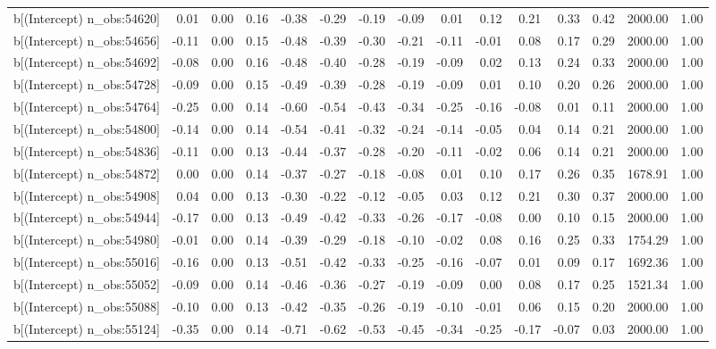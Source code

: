 \begin{table}[ht]
\begin{tabular}{rrrrrrrrrrrrrrr}
  b[(Intercept) n\_obs:54620] & 0.01 & 0.00 & 0.16 & -0.38 & -0.29 & -0.19 & -0.09 & 0.01 & 0.12 & 0.21 & 0.33 & 0.42 & 2000.00 & 1.00 \\ 
  b[(Intercept) n\_obs:54656] & -0.11 & 0.00 & 0.15 & -0.48 & -0.39 & -0.30 & -0.21 & -0.11 & -0.01 & 0.08 & 0.17 & 0.29 & 2000.00 & 1.00 \\ 
  b[(Intercept) n\_obs:54692] & -0.08 & 0.00 & 0.16 & -0.48 & -0.40 & -0.28 & -0.19 & -0.09 & 0.02 & 0.13 & 0.24 & 0.33 & 2000.00 & 1.00 \\ 
  b[(Intercept) n\_obs:54728] & -0.09 & 0.00 & 0.15 & -0.49 & -0.39 & -0.28 & -0.19 & -0.09 & 0.01 & 0.10 & 0.20 & 0.26 & 2000.00 & 1.00 \\ 
  b[(Intercept) n\_obs:54764] & -0.25 & 0.00 & 0.14 & -0.60 & -0.54 & -0.43 & -0.34 & -0.25 & -0.16 & -0.08 & 0.01 & 0.11 & 2000.00 & 1.00 \\ 
  b[(Intercept) n\_obs:54800] & -0.14 & 0.00 & 0.14 & -0.54 & -0.41 & -0.32 & -0.24 & -0.14 & -0.05 & 0.04 & 0.14 & 0.21 & 2000.00 & 1.00 \\ 
  b[(Intercept) n\_obs:54836] & -0.11 & 0.00 & 0.13 & -0.44 & -0.37 & -0.28 & -0.20 & -0.11 & -0.02 & 0.06 & 0.14 & 0.21 & 2000.00 & 1.00 \\ 
  b[(Intercept) n\_obs:54872] & 0.00 & 0.00 & 0.14 & -0.37 & -0.27 & -0.18 & -0.08 & 0.01 & 0.10 & 0.17 & 0.26 & 0.35 & 1678.91 & 1.00 \\ 
  b[(Intercept) n\_obs:54908] & 0.04 & 0.00 & 0.13 & -0.30 & -0.22 & -0.12 & -0.05 & 0.03 & 0.12 & 0.21 & 0.30 & 0.37 & 2000.00 & 1.00 \\ 
  b[(Intercept) n\_obs:54944] & -0.17 & 0.00 & 0.13 & -0.49 & -0.42 & -0.33 & -0.26 & -0.17 & -0.08 & 0.00 & 0.10 & 0.15 & 2000.00 & 1.00 \\ 
  b[(Intercept) n\_obs:54980] & -0.01 & 0.00 & 0.14 & -0.39 & -0.29 & -0.18 & -0.10 & -0.02 & 0.08 & 0.16 & 0.25 & 0.33 & 1754.29 & 1.00 \\ 
  b[(Intercept) n\_obs:55016] & -0.16 & 0.00 & 0.13 & -0.51 & -0.42 & -0.33 & -0.25 & -0.16 & -0.07 & 0.01 & 0.09 & 0.17 & 1692.36 & 1.00 \\ 
  b[(Intercept) n\_obs:55052] & -0.09 & 0.00 & 0.14 & -0.46 & -0.36 & -0.27 & -0.19 & -0.09 & 0.00 & 0.08 & 0.17 & 0.25 & 1521.34 & 1.00 \\ 
  b[(Intercept) n\_obs:55088] & -0.10 & 0.00 & 0.13 & -0.42 & -0.35 & -0.26 & -0.19 & -0.10 & -0.01 & 0.06 & 0.15 & 0.20 & 2000.00 & 1.00 \\ 
  b[(Intercept) n\_obs:55124] & -0.35 & 0.00 & 0.14 & -0.71 & -0.62 & -0.53 & -0.45 & -0.34 & -0.25 & -0.17 & -0.07 & 0.03 & 2000.00 & 1.00 \\ 

\end{tabular}
\end{table}
